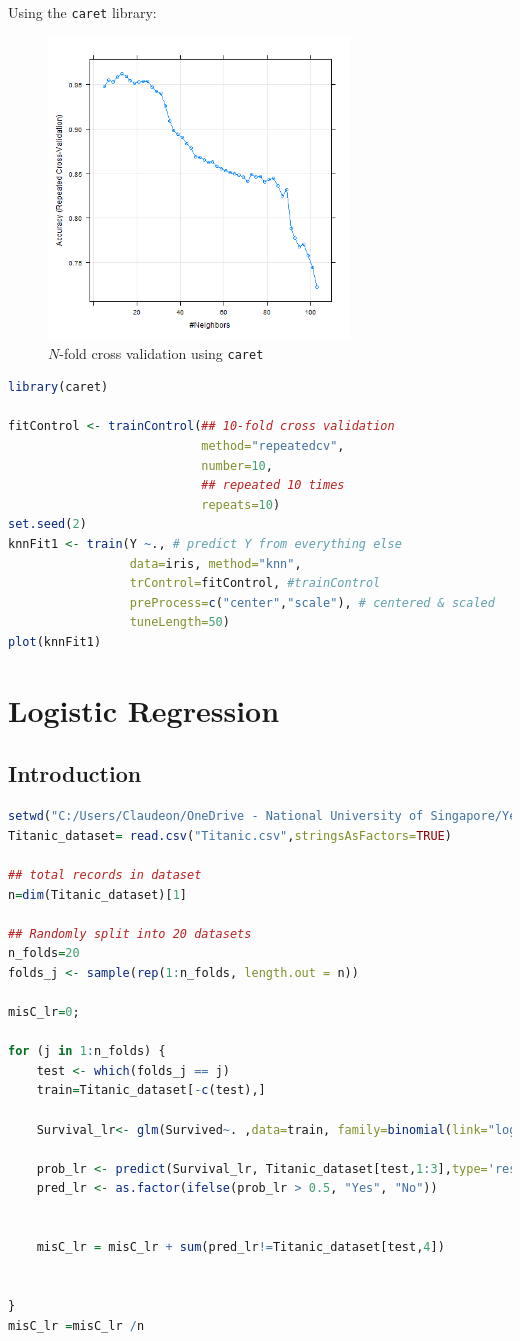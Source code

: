\documentclass{article}
\begin{document}
Using the \texttt{caret} library:
\begin{figure}[H]
    \centering
    \includegraphics[width=8cm]{images/ncv_caret.png}
    \caption{$N$-fold cross validation using \texttt{caret}}
\end{figure}
\begin{lstlisting}[language=R]
library(caret)

fitControl <- trainControl(## 10-fold cross validation
                           method="repeatedcv",
                           number=10,
                           ## repeated 10 times
                           repeats=10)
set.seed(2)
knnFit1 <- train(Y ~., # predict Y from everything else
                 data=iris, method="knn",
                 trControl=fitControl, #trainControl
                 preProcess=c("center","scale"), # centered & scaled
                 tuneLength=50)
plot(knnFit1)
\end{lstlisting}

\section{Logistic Regression}
\subsection{Introduction}
\begin{lstlisting}[language=R]
setwd("C:/Users/Claudeon/OneDrive - National University of Singapore/Year 1 Sem 2/DSA1101/Tutorials/Tutorial 5")
Titanic_dataset= read.csv("Titanic.csv",stringsAsFactors=TRUE)

## total records in dataset
n=dim(Titanic_dataset)[1]

## Randomly split into 20 datasets 
n_folds=20
folds_j <- sample(rep(1:n_folds, length.out = n))

misC_lr=0;

for (j in 1:n_folds) {
	test <- which(folds_j == j)
	train=Titanic_dataset[-c(test),]

	Survival_lr<- glm(Survived~. ,data=train, family=binomial(link="logit"))

	prob_lr <- predict(Survival_lr, Titanic_dataset[test,1:3],type='response')
	pred_lr <- as.factor(ifelse(prob_lr > 0.5, "Yes", "No"))


    misC_lr = misC_lr + sum(pred_lr!=Titanic_dataset[test,4])


}
misC_lr =misC_lr /n
\end{lstlisting}
\end{document}
